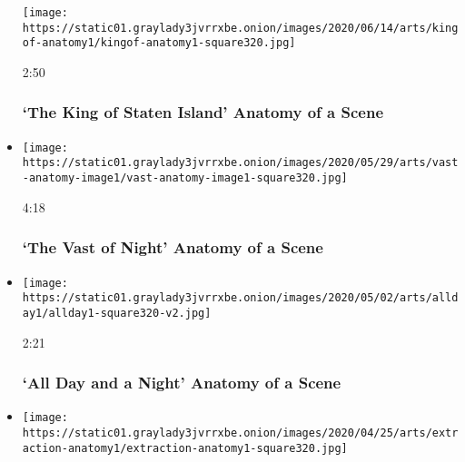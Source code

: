 \begin{itemize}
  \texttt{[image: https://static01.graylady3jvrrxbe.onion/images/2020/06/14/arts/kingof-anatomy1/kingof-anatomy1-square320.jpg]}

  2:50

  \hypertarget{the-king-of-staten-island--anatomy-of-a-scene}{%
  \subsubsection{`The King of Staten Island' \textbar{} Anatomy of a
  Scene}\label{the-king-of-staten-island--anatomy-of-a-scene}}
\item
  \href{https://www.nytimes3xbfgragh.onion/video/movies/the-vast-of-night-scene.html?action=click\&module=video-series-bar\&region=header\&pgtype=Article\&playlistId=video/anatomy-of-a-scene}{}

  \texttt{[image: https://static01.graylady3jvrrxbe.onion/images/2020/05/29/arts/vast-anatomy-image1/vast-anatomy-image1-square320.jpg]}

  4:18

  \hypertarget{the-vast-of-night--anatomy-of-a-scene}{%
  \subsubsection{`The Vast of Night' \textbar{} Anatomy of a
  Scene}\label{the-vast-of-night--anatomy-of-a-scene}}
\item
  \href{https://www.nytimes3xbfgragh.onion/video/movies/100000007115897/all-day-and-a-night-scene.html?action=click\&module=video-series-bar\&region=header\&pgtype=Article\&playlistId=video/anatomy-of-a-scene}{}

  \texttt{[image: https://static01.graylady3jvrrxbe.onion/images/2020/05/02/arts/allday1/allday1-square320-v2.jpg]}

  2:21

  \hypertarget{all-day-and-a-night--anatomy-of-a-scene}{%
  \subsubsection{`All Day and a Night' \textbar{} Anatomy of a
  Scene}\label{all-day-and-a-night--anatomy-of-a-scene}}
\item
  \href{https://www.nytimes3xbfgragh.onion/video/movies/100000007104270/extraction-scene.html?action=click\&module=video-series-bar\&region=header\&pgtype=Article\&playlistId=video/anatomy-of-a-scene}{}

  \texttt{[image: https://static01.graylady3jvrrxbe.onion/images/2020/04/25/arts/extraction-anatomy1/extraction-anatomy1-square320.jpg]}


\end{itemize}
